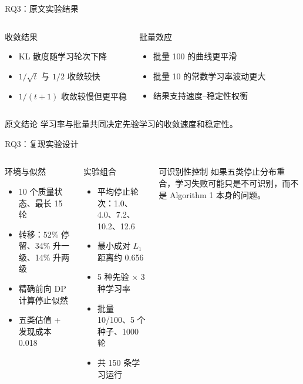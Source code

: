 \begin{frame}{RQ3：原文实验结果}
\begin{columns}[T,onlytextwidth]
\begin{exampleblock}{收敛结果}
\begin{itemize}
  \item KL 散度随学习轮次下降
  \item $1/\sqrt t$ 与 $1/2$ 收敛较快
  \item $1/(t+1)$ 收敛较慢但更平稳
\end{itemize}
\end{exampleblock}
\begin{exampleblock}{批量效应}
\begin{itemize}
  \item 批量 100 的曲线更平滑
  \item 批量 10 的常数学习率波动更大
  \item 结果支持速度--稳定性权衡
\end{itemize}
\end{exampleblock}
\end{columns}
\begin{alertblock}{原文结论}
学习率与批量共同决定先验学习的收敛速度和稳定性。
\end{alertblock}
\end{frame}

\begin{frame}{RQ3：复现实验设计}
\begin{columns}[T,onlytextwidth]
\begin{block}{环境与似然}
\begin{itemize}
  \item 10 个质量状态、最长 15 轮
  \item 转移：52\% 停留、34\% 升一级、14\% 升两级
  \item 精确前向 DP 计算停止似然
  \item 五类估值 + 发现成本 0.018
\end{itemize}
\end{block}
\begin{block}{实验组合}
\begin{itemize}
  \item 平均停止轮次：1.0、4.0、7.2、10.2、12.6
  \item 最小成对 $L_1$ 距离约 0.656
  \item 5 种先验 $\times$ 3 种学习率
  \item 批量 10/100、5 个种子、1000 轮
  \item 共 150 条学习运行
\end{itemize}
\end{block}
\begin{alertblock}{可识别性控制}
如果五类停止分布重合，学习失败可能只是不可识别，而不是 Algorithm 1 本身的问题。
\end{alertblock}
\end{columns}
\end{frame}

